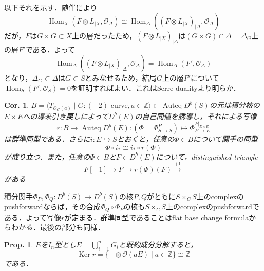 \documentclass[uplatex,a4paper,11pt,dvipdfmx]{jsarticle}
\makeatletter
\theoremstyle{mystyle} %
\newtheorem{proposition}[theorem]{Prop.}
\newtheorem{corollary}[theorem]{Cor.}
\renewenvironment{proof}[1][\proofname]{\par
 \pushQED{\qed}%
 \normalfont \topsep6\p@\@plus6\p@\relax
 \trivlist
 \item[\hskip\labelsep
 \itshape
 {\bf\underline{#1}}]\ignorespaces
}{%
 \popQED\endtrivlist\@endpefalse
}
\DeclareMathOperator{\Auteq}{Auteq}\DeclareMathOperator{\Coh}{Coh}
\DeclareMathOperator{\Hom}{Hom}
\DeclareMathOperator{\Ker}{Ker}
\makeatother
\begin{document}
\begin{proof}
	以下それを示す．随伴により$$\Hom_X(F\otimes L_{|X}, \mathcal{O}_\Delta)\cong\Hom_\Delta((F\otimes L_{|X})_{|\Delta}, \mathcal{O}_\Delta)$$だが，$F$は$G \times G \subset X$上の層だったため，$(F\otimes L_{|X})_{|\Delta}$は$(G \times G) \cap \Delta = \Delta_G$上の層$F'$である．よって$$\Hom_\Delta((F\otimes L_{|X})_{|\Delta}, \mathcal{O}_\Delta)=\Hom_\Delta(F', \mathcal{O}_\Delta)$$となり，$\Delta_G \subset \Delta$は$G \subset S$とみなせるため，結局$G$上の層$F'$について$\Hom_S(F', \mathcal{O}_S)=0$を証明すればよい．これはSerre dualityより明らか．
\end{proof}

\begin{corollary}\label{restriction_map}
	$B = \langle T_{\mathcal{O}_G(a)} \mid G \colon \text{$(-2)$-curve}, a \in \mathbb{Z} \rangle \subset \Auteq D^b(S)$の元は積分核の$E\times E$への導来引き戻しによって$D^b(E)$の自己同値を誘導し，それによる写像$$r \colon B \to \Auteq D^b(E) \colon (\Phi = \Phi^P_{S \to S}) \mapsto \Phi^{P|_{E \times E}}_{E \to E}$$は群準同型である．さらに$i \colon E \hookrightarrow S$とおくと，任意の$\Phi \in B$について関手の同型$$\Phi \circ i_* \cong i_* \circ r(\Phi)$$が成り立つ．また，任意の$\Phi \in B$と$F \in D^b(E)$について，distinguished triangle$$F[-1] \to F\to r(\Phi)(F) \xrightarrow{+1} $$がある
\end{corollary}
\begin{proof}
	積分関手$\Phi_P, \Phi_Q \colon D^b(S) \to D^b(S)$の核$P, Q$がともに$S \times_C S$上のcomplexのpushforwardならば，その合成$\Phi_Q \circ \Phi_P$の核も$S \times_C S$上のcomplexのpushforwardである．よって写像$r$が定まる．群準同型であることはflat base change formulaからわかる．最後の部分も同様．
\end{proof}
\begin{proposition}
	$E$を$I_n$型とし$E = \bigcup_{i=1}^n G_i$と既約成分分解すると，$$\Ker r = \{-\otimes \mathcal{O}(aE) \mid a \in \mathbb{Z}\} \cong \mathbb{Z}$$である．
\end{proposition}
\end{document}
